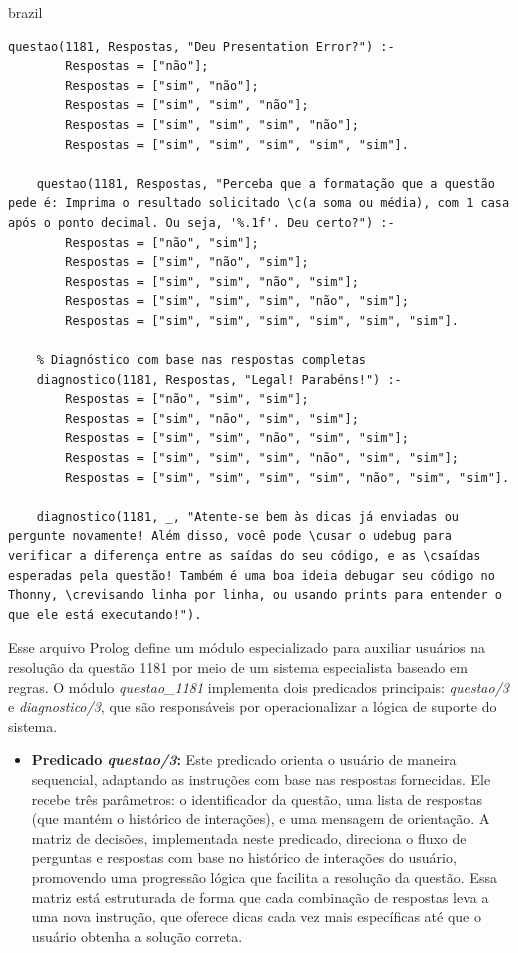 \begin{otherlanguage*}{brazil}
\begin{lstlisting}[style=ufscthesisx_style, caption={Arquivo \textit{questao\_1181.pl}}]
    questao(1181, Respostas, "Deu Presentation Error?") :-
        Respostas = ["não"];
        Respostas = ["sim", "não"];
        Respostas = ["sim", "sim", "não"];
        Respostas = ["sim", "sim", "sim", "não"];
        Respostas = ["sim", "sim", "sim", "sim", "sim"].
    
    questao(1181, Respostas, "Perceba que a formatação que a questão pede é: Imprima o resultado solicitado \c(a soma ou média), com 1 casa após o ponto decimal. Ou seja, '%.1f'. Deu certo?") :-
        Respostas = ["não", "sim"];
        Respostas = ["sim", "não", "sim"];
        Respostas = ["sim", "sim", "não", "sim"];
        Respostas = ["sim", "sim", "sim", "não", "sim"];
        Respostas = ["sim", "sim", "sim", "sim", "sim", "sim"].
    
    % Diagnóstico com base nas respostas completas
    diagnostico(1181, Respostas, "Legal! Parabéns!") :-
        Respostas = ["não", "sim", "sim"];
        Respostas = ["sim", "não", "sim", "sim"];
        Respostas = ["sim", "sim", "não", "sim", "sim"];
        Respostas = ["sim", "sim", "sim", "não", "sim", "sim"];
        Respostas = ["sim", "sim", "sim", "sim", "não", "sim", "sim"].
    
    diagnostico(1181, _, "Atente-se bem às dicas já enviadas ou pergunte novamente! Além disso, você pode \cusar o udebug para verificar a diferença entre as saídas do seu código, e as \csaídas esperadas pela questão! Também é uma boa ideia debugar seu código no Thonny, \crevisando linha por linha, ou usando prints para entender o que ele está executando!").
\end{lstlisting}    

Esse arquivo Prolog define um módulo especializado para auxiliar usuários na resolução da questão 1181 por meio de um sistema especialista baseado em regras. O módulo \textit{questao\_1181} implementa dois predicados principais: \textit{questao/3} e \textit{diagnostico/3}, que são responsáveis por operacionalizar a lógica de suporte do sistema.

\begin{itemize}
    \item \textbf{Predicado \textit{questao/3}:} Este predicado orienta o usuário de maneira sequencial, adaptando as instruções com base nas respostas fornecidas. Ele recebe três parâmetros: o identificador da questão, uma lista de respostas (que mantém o histórico de interações), e uma mensagem de orientação. A matriz de decisões, implementada neste predicado, direciona o fluxo de perguntas e respostas com base no histórico de interações do usuário, promovendo uma progressão lógica que facilita a resolução da questão. Essa matriz está estruturada de forma que cada combinação de respostas leva a uma nova instrução, que oferece dicas cada vez mais específicas até que o usuário obtenha a solução correta.


\end{itemize}
\end{otherlanguage*}
